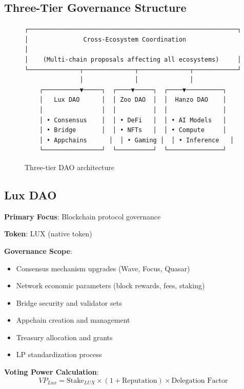 \documentclass[11pt,a4paper]{article}
\begin{document}
\subsection{Three-Tier Governance Structure}

\begin{figure}[h]
\centering
\begin{verbatim}
┌─────────────────────────────────────────────────────────┐
│               Cross-Ecosystem Coordination               │
│    (Multi-chain proposals affecting all ecosystems)     │
└──────────────┬──────────────┬──────────────┬────────────┘
               │              │              │
    ┌──────────▼─────┐  ┌────▼─────┐  ┌────▼──────────┐
    │   Lux DAO      │  │ Zoo DAO  │  │  Hanzo DAO    │
    │                │  │          │  │               │
    │ • Consensus    │  │ • DeFi   │  │ • AI Models   │
    │ • Bridge       │  │ • NFTs   │  │ • Compute     │
    │ • Appchains      │  │ • Gaming │  │ • Inference   │
    └────────────────┘  └──────────┘  └───────────────┘
\end{verbatim}
\caption{Three-tier DAO architecture}
\end{figure}

\subsection{Lux DAO}

\textbf{Primary Focus}: Blockchain protocol governance

\textbf{Token}: LUX (native token)

\textbf{Governance Scope}:
\begin{itemize}
\item Consensus mechanism upgrades (Wave, Focus, Quasar)
\item Network economic parameters (block rewards, fees, staking)
\item Bridge security and validator sets
\item Appchain creation and management
\item Treasury allocation and grants
\item LP standardization process
\end{itemize}

\textbf{Voting Power Calculation}:
\begin{equation}
VP_{Lux} = \text{Stake}_{LUX} \times (1 + \text{Reputation}) \times \text{Delegation Factor}
\end{equation}
\end{document}
